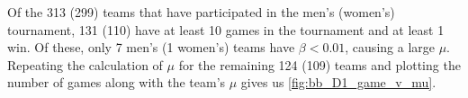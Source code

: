 \documentclass{article}
\begin{document}
Of the 313 (299) teams that have participated in the men's (women's) tournament, 131 (110) have at least 10 games in the tournament and at least 1 win.  Of these, only 7 men's (1 women's) teams have $\beta<0.01$, causing a large $\mu$.  Repeating the calculation of $\mu$ for the remaining 124 (109) teams and plotting the number of games along with the team's $\mu$ gives us \autoref{fig:bb_D1_game_v_mu}.
\end{document}
